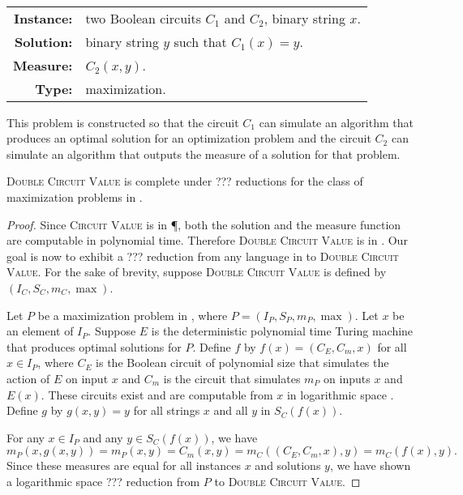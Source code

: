 \documentclass[]{article}
\begin{document}
\begin{definition}
  \mbox{} \\
  \begin{tabular}{r l}
    \textbf{Instance:} & two Boolean circuits $C_1$ and $C_2$, binary string $x$. \\
    \textbf{Solution:} & binary string $y$ such that $C_1(x) = y$. \\
    \textbf{Measure:} & $C_2(x, y)$. \\
    \textbf{Type:} & maximization.
  \end{tabular}
\end{definition}

This problem is constructed so that the circuit $C_1$ can simulate an algorithm that produces an optimal solution for an optimization problem and the circuit $C_2$ can simulate an algorithm that outputs the measure of a solution for that problem.

\begin{theorem}
  \textsc{Double Circuit Value} is complete under ??? reductions for the class of maximization problems in \PO.
\end{theorem}
\begin{proof}
  Since \textsc{Circuit Value} is in \P, both the solution and the measure function are computable in polynomial time.
  Therefore \textsc{Double Circuit Value} is in \PO.
  Our goal is now to exhibit a ??? reduction from any language in \PO{} to \textsc{Double Circuit Value}.
  For the sake of brevity, suppose \textsc{Double Circuit Value} is defined by $(I_C, S_C, m_C, \max)$.

  Let $P$ be a maximization problem in \PO, where $P = (I_P, S_P, m_P, \max)$.
  Let $x$ be an element of $I_P$.
  Suppose $E$ is the deterministic polynomial time Turing machine that produces optimal solutions for $P$.
  Define $f$ by $f(x) = (C_E, C_m, x)$ for all $x \in I_P$, where $C_E$ is the Boolean circuit of polynomial size that simulates the action of $E$ on input $x$ and $C_m$ is the circuit that simulates $m_P$ on inputs $x$ and $E(x)$.
  These circuits exist and are computable from $x$ in logarithmic space \cite{ladner75}.
  Define $g$ by $g(x, y) = y$ for all strings $x$ and all $y$ in $S_C(f(x))$.

  For any $x \in I_P$ and any $y \in S_C(f(x))$, we have
  \begin{equation*}
    m_P(x, g(x, y)) = m_P(x, y) = C_m(x, y) = m_C((C_E, C_m, x), y) = m_C(f(x), y).
  \end{equation*}
  Since these measures are equal for all instances $x$ and solutions $y$, we have shown a logarithmic space ??? reduction from $P$ to \textsc{Double Circuit Value}.
\end{proof}
\end{document}
